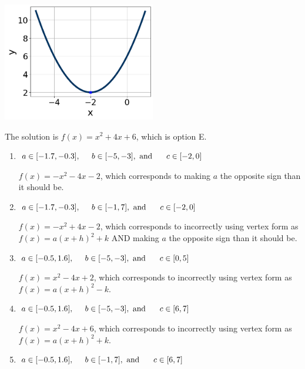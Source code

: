 \documentclass{extbook}[14pt]
\begin{document}
\begin{enumerate}
{\begin{center}
    \includegraphics[width=0.5\textwidth]{../Figures/quadraticGraphToEquationA.png}
\end{center}


The solution is \( f(x) = x^{2} +4 x + 6 \), which is option E.\begin{enumerate}[label=\Alph*.]
\item \( a \in [-1.7, -0.3], \hspace*{5mm} b \in [-5, -3], \text{ and } \hspace*{5mm} c \in [-2, 0] \)

$f(x)=-x^{2} -4 x -2$, which corresponds to making $a$ the opposite sign than it should be.
\item \( a \in [-1.7, -0.3], \hspace*{5mm} b \in [-1, 7], \text{ and } \hspace*{5mm} c \in [-2, 0] \)

$f(x)=-x^{2} +4 x -2$, which corresponds to incorrectly using vertex form as $f(x) = a(x+h)^2+k$ AND making $a$ the opposite sign than it should be.
\item \( a \in [-0.5, 1.6], \hspace*{5mm} b \in [-5, -3], \text{ and } \hspace*{5mm} c \in [0, 5] \)

$f(x)=x^{2} -4 x + 2$, which corresponds to incorrectly using vertex form as $f(x) = a(x+h)^2 - k$.
\item \( a \in [-0.5, 1.6], \hspace*{5mm} b \in [-5, -3], \text{ and } \hspace*{5mm} c \in [6, 7] \)

$f(x)=x^{2} -4 x + 6$, which corresponds to incorrectly using vertex form as $f(x) = a(x+h)^2+k$.
\item \( a \in [-0.5, 1.6], \hspace*{5mm} b \in [-1, 7], \text{ and } \hspace*{5mm} c \in [6, 7] \)


\end{enumerate}}
\end{enumerate}
\end{document}
